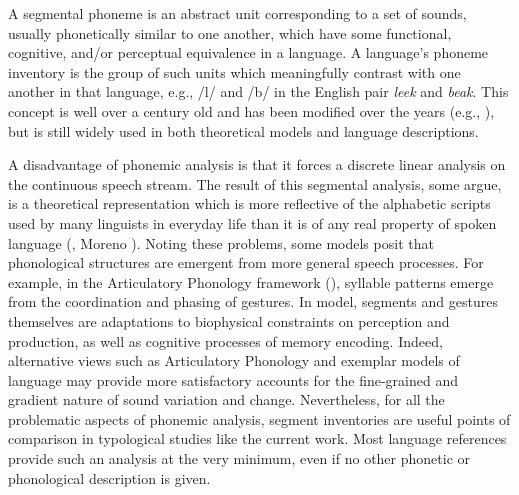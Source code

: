   A segmental phoneme is an abstract unit corresponding to a set of sounds, usually phonetically similar to one another, which have some functional, cognitive, and/or perceptual equivalence in a language. A language’s phoneme inventory is the group of such units which meaningfully contrast with one another in that language, e.g., /l/ and /b/ in the English pair \textit{leek} and \textit{beak}. This concept is well over a century old and has been modified over the years (e.g., \citealt{Sapir1925,ChomskyHalle1968}), but is still widely used in both theoretical models and language descriptions. 

  A disadvantage of phonemic analysis is that it forces a discrete linear analysis on the continuous speech stream. The result of this segmental analysis, some argue, is a theoretical representation which is more reflective of the alphabetic scripts used by many linguists in everyday life than it is of any real property of spoken language (\citealt{Port2006}, Moreno \citealt{Cabrera2008}). Noting these problems, some models posit that phonological structures are emergent from more general speech processes. For example, in the Articulatory Phonology framework (\citealt{BrowmanGoldstein1992b}), syllable patterns emerge from the coordination and phasing of gestures. In  model, segments and gestures themselves are adaptations to biophysical constraints on perception and production, as well as cognitive processes of memory encoding. Indeed, alternative views such as Articulatory Phonology and exemplar models of language \citep{Bybee2001} may provide more satisfactory accounts for the fine-grained and gradient nature of sound variation and change. Nevertheless, for all the problematic aspects of phonemic analysis, segment inventories are useful points of comparison in typological studies like the current work. Most language references provide such an analysis at the very minimum, even if no other phonetic or phonological description is given.

